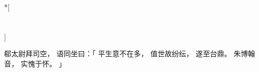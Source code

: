 
\switchcolumn[0]*[\section{}]

郗太尉拜司空，
语同坐曰：「
    平生意不在多，
    值世故纷纭，
    遂至台鼎。
    朱博翰音，
    实愧于怀。
」

\switchcolumn


